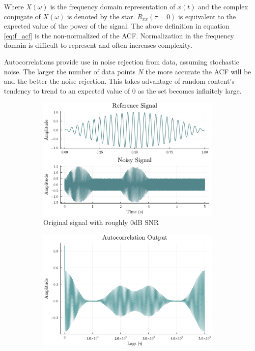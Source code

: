             Where $X(\omega)$ is the frequency domain representation of $x(t)$ and the complex conjugate of $X(\omega)$ is denoted by the star. ${R}_{xx}(\tau=0)$ is equivalent to the expected value of the power of the signal. The above definition in equation \ref*{eq:f_acf} is the non-normalized of the ACF. Normalization in the frequency domain is difficult to represent and often increases complexity. 
            
            Autocorrelations provide use in noise rejection from data, assuming stochastic noise. The larger the number of data points $N$ the more accurate the ACF will be and the better the noise rejection. This takes advantage of random content's tendency to trend to an expected value of 0 as the set becomes infinitely large.

            \begin{figure} [h]
                \centering
                \begin{subfigure}[c]{0.49\textwidth}
                    \centering
                    \includegraphics[width=\textwidth]{images/Background/Auto Correlation Reference and Data.pdf}
                    \caption{Original signal with roughly 0dB SNR}
                    \label{fig: original signal autocorr}
                \end{subfigure}
                \hfill
                \begin{subfigure}[c]{0.49\textwidth}
                    \centering
                    \includegraphics[width=\textwidth]{images/Background/AutoCorrelation Output.pdf}

\end{subfigure}
\end{figure}
